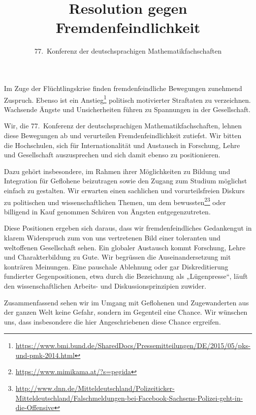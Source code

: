 \documentclass[12pt,a4paper,ngerman,DIV=14,draft]{scrartcl}
\author{77.~Konferenz der deutschsprachigen Mathematikfachschaften}
\title{Resolution gegen Fremdenfeindlichkeit}
\begin{document}
\maketitle{}


Im Zuge der Flüchtlingskrise finden fremdenfeindliche Bewegungen
zunehmend Zuspruch. Ebenso ist ein
Anstieg\footnote{\url{https://www.bmi.bund.de/SharedDocs/Pressemitteilungen/DE/2015/05/pks-und-pmk-2014.html}}
politisch motivierter Straftaten zu verzeichnen. Wachsende Ängste und
Unsicherheiten führen zu Spannungen in der Gesellschaft.

Wir, die 77.~Konferenz der deutschsprachigen Mathematikfachschaften,
lehnen diese Bewegungen ab und verurteilen Fremdenfeindlichkeit
zutiefst. Wir bitten die Hochschulen, sich für Internationalität und
Austausch in Forschung, Lehre und Gesellschaft auszusprechen und sich
damit ebenso zu positionieren.

Dazu gehört insbesondere, im Rahmen ihrer Möglichkeiten zu Bildung und
Integration für Geflohene beizutragen sowie den Zugang zum Studium
möglichst einfach zu gestalten. Wir erwarten einen sachlichen und
vorurteilsfreien Diskurs zu politischen und wissenschaftlichen Themen,
um dem
bewussten\footnote{\url{https://www.mimikama.at/?s=pegida}}\footnote{\url{http://www.dnn.de/Mitteldeutschland/Polizeiticker-Mitteldeutschland/Falschmeldungen-bei-Facebook-Sachsens-Polizei-geht-in-die-Offensive}}
oder billigend in Kauf genommen Schüren von Ängsten entgegenzutreten.

Diese Positionen ergeben sich daraus, dass wir fremdenfeindliches
Gedankengut in klarem Widerspruch zum von uns vertretenen Bild einer
toleranten und weltoffenen Gesellschaft sehen. Ein globaler Austausch
kommt Forschung, Lehre und Charakterbildung zu Gute. Wir begrüssen die
Auseinandersetzung mit konträren Meinungen. Eine pauschale Ablehnung
oder gar Diskreditierung fundierter Gegenpositionen, etwa durch die
Bezeichnung als „Lügenpresse“, läuft den wissenschaftlichen Arbeits-
und Diskussionsprinzipien zuwider.

Zusammenfassend sehen wir im Umgang mit Geflohenen und Zugewanderten
aus der ganzen Welt keine Gefahr, sondern im Gegenteil eine
Chance. Wir wünschen uns, dass insbesondere die hier Angeschriebenen
diese Chance ergreifen.
\end{document}
